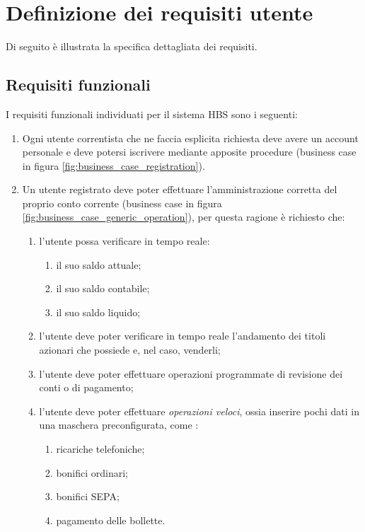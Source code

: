
\section{Definizione dei requisiti utente}

Di seguito \`e illustrata la specifica dettagliata dei requisiti.

\subsection{Requisiti funzionali}

I requisiti funzionali individuati per il sistema HBS sono i seguenti:

\begin{enumerate}
	\item Ogni utente correntista che ne faccia esplicita richiesta deve avere un account personale e deve potersi iscrivere  mediante apposite procedure (business case in figura \ref{fig:business_case_registration}).
	\item Un utente registrato deve poter effettuare l'amministrazione corretta del proprio conto corrente (business case in figura \ref{fig:business_case_generic_operation}), per questa ragione è richiesto che:
	\begin{enumerate}
		\item l'utente possa verificare in tempo reale:
			\begin{enumerate}
				\item il suo saldo attuale;
				\item il suo saldo contabile;
				\item il suo saldo liquido;
			\end{enumerate} 
		\item l'utente deve poter verificare in tempo reale l'andamento dei titoli azionari che possiede e, nel caso, venderli;
		\item l'utente deve poter effettuare operazioni programmate di revisione dei conti o di pagamento;
		\item l'utente deve poter effettuare \emph{operazioni veloci}, ossia inserire pochi dati in una maschera preconfigurata, come :
			\begin{enumerate}
				\item ricariche telefoniche;
				\item bonifici ordinari;
				\item bonifici SEPA;
				\item pagamento delle bollette.
			\end{enumerate} 

\end{enumerate}
\end{enumerate}
